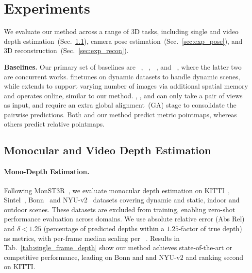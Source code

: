 
\section{Experiments}
We evaluate our method across a range of 3D tasks, including single and video depth estimation~(Sec.~\ref{sec:exp_depth}), camera pose estimation~(Sec.~\ref{sec:exp_pose}), and 3D reconstruction~(Sec.~\ref{sec:exp_recon}). 

\vspace{0.5em}\noindent\textbf{Baselines.}
Our primary set of baselines are \duster{}~\cite{wang2024dust3r}, \master{}~\cite{leroy2024mast3r}, \spanner{}~\cite{spann3r}, and \monster{}~\cite{zhang2024monst3r}, where the latter two are concurrent works. \monster{} finetunes \duster{} on dynamic datasets to handle dynamic scenes, while \spanner{} extends \duster{} to support varying number of images via additional spatial memory and operates online, similar to our method. \duster{}, \master{}, and \monster{} can only take a pair of views as input, and require an extra global alignment~(GA) stage to consolidate the pairwise predictions. Both \master{} and our method predict metric pointmaps, whereas others predict relative pointmaps.



\subsection{Monocular and Video Depth Estimation}
\label{sec:exp_depth}

\paragraph{Mono-Depth Estimation.} Following MonST3R~\cite{zhang2024monst3r}, 
we evaluate monocular depth estimation on KITTI~\cite{kitti}, Sintel~\cite{sintel}, Bonn~\cite{bonn} and NYU-v2~\cite{nyuv2} datasets covering dynamic and static, indoor and outdoor scenes. These datasets are excluded from training, enabling zero-shot performance evaluation across domains.
We use absolute relative error (Abs Rel) and $\delta < 1.25$ (percentage of predicted depths within a $1.25$-factor of true depth) as metrics, with per-frame median scaling per \duster{}~\cite{wang2024dust3r}. Results in Tab.~\ref{tab:single_frame_depth} show our method achieves state-of-the-art or competitive performance, leading on Bonn and and NYU-v2 and ranking second on KITTI.





